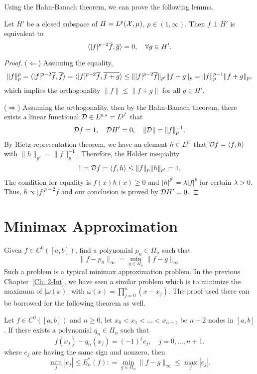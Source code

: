 Using the Hahn-Banach theorem, we can prove the following lemma. 
\begin{lemma}
    Let $H'$ be a closed subspace of $H=L^p(\mathcal X, \mu)$, $p\in(1,\infty)$. Then $f\perp H'$ is equivalent to 
    \begin{equation}
       \langle { {|f|^{p-2}} \overline{f},  \overline{g} } \rangle = 0,\quad \forall g\in H'.
    \end{equation}
\end{lemma}
\begin{proof}
($\Leftarrow$) Assuming the equality, 
    \begin{equation}
      \|f\|_p^p = \langle { |f|^{p-2} \overline{f}, \overline{f} } \rangle = \langle {|f|^{p-2} \overline{f},  \overline{f + g}} \rangle \le \| |f|^{p-2} \overline{f} \|_{p'} \|f+g\|_p = \|f\|_p^{p-1} \|f+g\|_p,
    \end{equation}
    which implies the orthogonality $\|f\|\le \|f + g\|$ for all $g\in H'$. 
    
($\Rightarrow$) Assuming the orthogonality, then by the Hahn-Banach theorem, there exists a linear functional $\mathcal D\in L^{p,\ast}=L^{p'}$ that 
\begin{equation}
    \mathcal D f = 1,\quad \mathcal D H' = 0, \quad \|\mathcal D\|= \|f\|_p^{-1}. 
\end{equation}
By Rietz representation theorem, we have an element $h\in L^{p'}$ that $\mathcal D f = \langle {f, h} \rangle$ with $\|h\|_{p'}=\|f\|_p^{-1}$. Therefore, the H\"older inequality 
\begin{equation}
    1 =\mathcal D f = \langle {f, h} \rangle \le \|f\|_p \|h\|_{p'} = 1. 
\end{equation}
The condition for equality is $f(x) h(x) \ge 0$ and $|h|^{p'} = \lambda |f|^p$ for certain $\lambda > 0$. Thus, $h \propto |f|^{p-2} \overline{f}$ and our conclusion is proved by $\mathcal D H' = 0$.
\end{proof}
\section{Minimax Approximation}
\label{Sec: 4-MIN-APP}
Given $f\in C^0([a, b])$, find a polynomial $p_n\in\Pi_n$ such that $$\|f - p_n\|_{\infty} = \min_{g\in\Pi_n} \|f - g\|_{\infty}$$
Such a problem is a typical minimax approximation problem. In the previous Chapter~\ref{Ch: 2-Int}, we have seen a similar problem which is to minimize the maximum of $|\omega(x)|$ with $\omega(x) = \prod_{j=0}^n(x - x_j)$. The proof used there can be borrowed for the following theorem as well. 

\begin{theorem}
\label{Thm: 4-DE-LA-VAL-POU}
    Let $f\in C^0([a, b])$ and $n\ge 0$, let $x_0<x_1<\dots<x_{n+1}$ be $n+2$ nodes in $[a, b]$. If there exists a polynomial $q_n\in\Pi_n$ such that 
    $$f(x_j) - q_n(x_j) = (-1)^j e_j,\quad j =0,\dots, n+1.$$ 
    where $e_j$ are having the same sign and nonzero, then 
    \begin{equation}
        \min_j |e_j|\le E_n^{\ast}(f): = \min_{g\in\Pi_n} \|f - g\|_{\infty} \le \max_j |e_j|.
    \end{equation}
\end{theorem}


